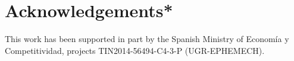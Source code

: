 \documentclass[utf8]{frontiersSCNS} %
\begin{document}
\section{Acknowledgements*}

This work has been supported in part by the Spanish Ministry of Economía y Competitividad, projects TIN2014-56494-C4-3-P (UGR-EPHEMECH).



\end{document}
